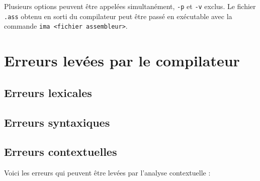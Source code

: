 \documentclass[a4paper, 10pt, french]{article}
\begin{document}
Plusieurs options peuvent être appelées simultanément, \texttt{-p} et \texttt{-v} exclus.
Le fichier \texttt{.ass} obtenu en sorti du compilateur peut \^etre pass\'e en exécutable avec la commande \texttt{ima <fichier assembleur>}.

\section{Erreurs levées par le compilateur}
\subsection{Erreurs lexicales}
\subsection{Erreurs syntaxiques}
\subsection{Erreurs contextuelles}
Voici les erreurs qui peuvent être levées par l'analyse contextuelle :
\end{document}
